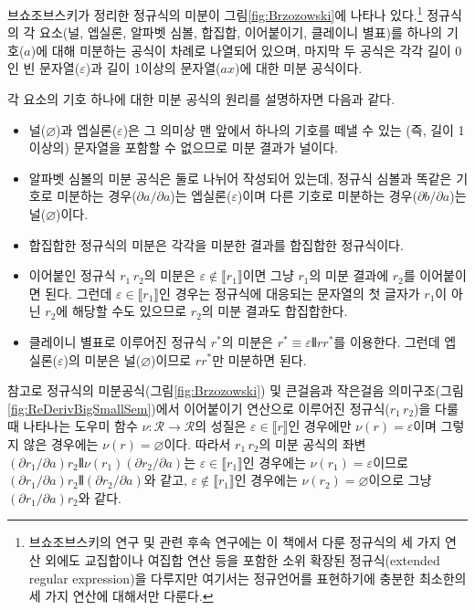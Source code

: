 브쇼조브스키가 정리한 정규식의 미분이 그림\;\ref{fig:Brzozowski}에
나타나 있다.\footnote{브쇼조브스키의 연구 및 관련 후속 연구에는
이 책에서 다룬 정규식의 세 가지 연산 외에도 교집합이나 여집합 연산 등을
포함한 소위 확장된 정규식(extended regular expression)을 다루지만 여기서는
정규언어를 표현하기에 충분한 최소한의 세 가지 연산에 대해서만 다룬다.}
정규식의 각 요소(널, 엡실론, 알파벳 심볼, 합집합, 이어붙이기,
클레이니 별표)를 하나의 기호($a$)에 대해 미분하는 공식이 차례로 나열되어
있으며, 마지막 두 공식은 각각 길이 0인 빈 문자열($\varepsilon$)과 길이
1이상의 문자열($ax$)에 대한 미분 공식이다.

각 요소의 기호 하나에 대한 미분 공식의 원리를 설명하자면 다음과 같다.
\begin{itemize}\tightlist
 \item 널($\varnothing$)과 엡실론($\varepsilon$)은 그 의미상
       맨 앞에서 하나의 기호를 떼낼 수 있는 (즉, 길이 1이상의)
       문자열을 포함할 수 없으므로 미분 결과가 널이다.
 \item 알파벳 심볼의 미분 공식은 둘로 나뉘어 작성되어 있는데,
   정규식 심볼과 똑같은 기호로 미분하는 경우($\partial a/\partial a$)는
   엡실론($\varepsilon$)이며
   다른 기호로 미분하는 경우($\partial b/\partial a$)는
   널($\varnothing$)이다.
 \item 합집합한 정규식의 미분은 각각을 미분한 결과를 합집합한 정규식이다.
 \item 이어붙인 정규식 $r_1\,r_2$의 미분은
       $\varepsilon\notin\llbracket r_1\rrbracket$이면 그냥
       $r_1$의 미분 결과에 $r_2$를 이어붙이면 된다.
       그런데 $\varepsilon\in\llbracket r_1\rrbracket$인 경우는
       정규식에 대응되는 문자열의 첫 글자가 $r_1$이 아닌 $r_2$에
       해당할 수도 있으므로 $r_2$의 미분 결과도 합집합한다.
 \item 클레이니 별표로 이루어진 정규식 $r^{*}$의 미분은
       $r^{*}\equiv \varepsilon\VERT rr^{*}$를 이용한다.
       그런데 엡실론($\varepsilon$)의 미분은 널($\varnothing$)이므로
       $rr^{*}$만 미분하면 된다.\vspace*{-1ex}
\end{itemize}
참고로 정규식의 미분공식(그림\;\ref{fig:Brzozowski}) 및
큰걸음과 작은걸음 의미구조(그림\;\ref{fig:ReDerivBigSmallSem})에서
이어붙이기 연산으로 이루어진 정규식($r_1\,r_2$)을 다룰 때 나타나는
도우미 함수 $\nu:\mathcal{R}\to\mathcal{R}$의 성질은
$\varepsilon \in \llbracket r \rrbracket$인 경우에만
$\nu(r)=\varepsilon$이며 그렇지 않은 경우에는
$\nu(r)=\varnothing$이다. 따라서 $r_1\,r_2$의 미분 공식의 좌변
$(\partial r_1/\partial a)r_2\VERT\nu(r_1)(\partial r_2/\partial a)$는
$\varepsilon \in \llbracket r_1 \rrbracket$인 경우에는
$\nu(r_1)=\varepsilon$이므로
$(\partial r_1/\partial a)r_2\VERT(\partial r_2/\partial a)$와 같고,
$\varepsilon \notin \llbracket r_1 \rrbracket$인 경우에는
$\nu(r_2)=\varnothing$이으로 그냥 $(\partial r_1/\partial a)r_2$와 같다.

